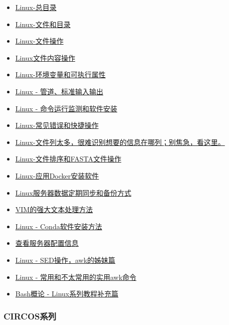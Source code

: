 \documentclass[]{article}
\providecommand{\tightlist}{%
  \setlength{\itemsep}{0pt}\setlength{\parskip}{0pt}}
\numberwithin{figure}{section}
\numberwithin{table}{section}
\begin{document}
\begin{itemize}
\tightlist
\item
  \href{http://mp.weixin.qq.com/s/hEYU80fPf1eD5OWL3fO4Bg}{Linux-总目录}
\item
  \href{http://mp.weixin.qq.com/s/yKP1Kboji9N4p2Sl1Ovj0Q}{Linux-文件和目录}
\item
  \href{http://mp.weixin.qq.com/s/4bYMzJclf_xHpqdrlbvAdA}{Linux-文件操作}
\item
  \href{http://mp.weixin.qq.com/s/QFgINAYcQA9kYYSA28wK-Q}{Linux文件内容操作}
\item
  \href{http://mp.weixin.qq.com/s/poFpNHQgHDr0qr2wqfVNdw}{Linux-环境变量和可执行属性}
\item
  \href{http://mp.weixin.qq.com/s/zL9Mw_2ig48gHrIjKM0CMw}{Linux - 管道、标准输入输出}
\item
  \href{http://mp.weixin.qq.com/s/TNU7X2mhfVVffaJ7NRBuNA}{Linux - 命令运行监测和软件安装}
\item
  \href{http://mp.weixin.qq.com/s/cDIN4_R4nETEB5irmIGFAQ}{Linux-常见错误和快捷操作}
\item
  \href{http://mp.weixin.qq.com/s/1QaroFE7AH1pREuq-k2YAw}{Linux-文件列太多，很难识别想要的信息在哪列；别焦急，看这里。}
\item
  \href{http://mp.weixin.qq.com/s/R1OHRhZoDJuAdyVdJr2xHg}{Linux-文件排序和FASTA文件操作}
\item
  \href{http://mp.weixin.qq.com/s/HLHiWMLaWtB7SOJe_jP3mA}{Linux-应用Docker安装软件}
\item
  \href{http://mp.weixin.qq.com/s/c2cspK5b4sQScWYMBtG63g}{Linux服务器数据定期同步和备份方式}
\item
  \href{https://mp.weixin.qq.com/s/4lUiZ60-aXLilRk9--iQhA}{VIM的强大文本处理方法}
\item
  \href{http://mp.weixin.qq.com/s/A4_j8ZbyprMr1TT_wgisQQ}{Linux - Conda软件安装方法}
\item
  \href{http://mp.weixin.qq.com/s/xq0JfkHJJeHQk1acjOAJUQ}{查看服务器配置信息}
\item
  \href{http://mp.weixin.qq.com/s/cywkIeRbhkYTZvkwTeIVSA}{Linux - SED操作，awk的姊妹篇}
\item
  \href{http://mp.weixin.qq.com/s/8wD14FXt7fLDo1BjJyT0ew}{Linux - 常用和不太常用的实用awk命令}
\item
  \href{http://mp.weixin.qq.com/s/lWNp_6W_jLiogmtlk9nO2A}{Bash概论 - Linux系列教程补充篇}
\end{itemize}

\hypertarget{circosux7cfbux5217}{%
\subsubsection{CIRCOS系列}\label{circosux7cfbux5217}}
\end{document}
